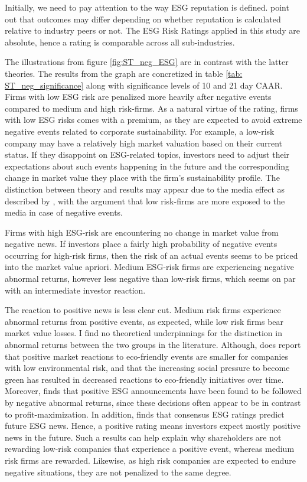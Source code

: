 Initially, we need to pay attention to the way ESG reputation is defined. \cite{rennings2007effect} point out that outcomes may differ depending on whether reputation is calculated relative to industry peers or not. The ESG Risk Ratings applied in this study are absolute, hence a rating is comparable across all sub-industries. 

The illustrations from figure \ref{fig:ST_neg_ESG} are in contrast with the latter theories. The results from the graph are concretized in table \ref{tab: ST_neg_significance} along with significance levels of 10 and 21 day CAAR. Firms with low ESG risk are penalized more heavily after negative events compared to medium and high risk-firms. As a natural virtue of the rating, firms with low ESG risks comes with a premium, as they are expected to avoid extreme negative events related to corporate sustainability. For example, a low-risk company may have a relatively high market valuation based on their current status. If they disappoint on ESG-related topics, investors need to adjust their expectations about such events happening in the future and the corresponding change in market value they place with the firm's sustainability profile. The distinction between theory and results may appear due to the media effect as described by \cite{noNewsgoodnews}, with the argument that low risk-firms are more exposed to the media in case of negative events. 

Firms with high ESG-risk are encountering no change in market value from negative news. If investors place a fairly high probability of negative events occurring for high-risk firms, then the risk of an actual events seems to be priced into the market value apriori. Medium ESG-risk firms are experiencing negative abnormal returns, however less negative than low-risk firms, which seems on par with an intermediate investor reaction.  

The reaction to positive news is less clear cut. Medium risk firms experience abnormal returns from positive events, as expected, while low risk firms bear market value losses. I find no theoretical underpinnings for the distinction in abnormal returns between the two groups in the literature. Although, \cite{flammer2013corporate} does report that positive market reactions to eco-friendly events are smaller for companies with low environmental risk, and that the increasing social pressure to become green has resulted in decreased reactions to eco-friendly initiatives over time. Moreover, \cite{fisher2011voluntary} finds that positive ESG announcements have been found to be followed by negative abnormal returns, since these decisions often appear to be in contrast to profit-maximization.  
In addition,\cite{serafeim2022stock} finds that consensus ESG ratings predict future ESG news. Hence, a positive rating means investors expect mostly positive news in the future. Such a results can help explain why shareholders are not rewarding low-risk companies that experience a positive event, whereas medium risk firms are rewarded. Likewise, as high risk companies are expected to endure negative situations, they are not penalized to the same degree.  


